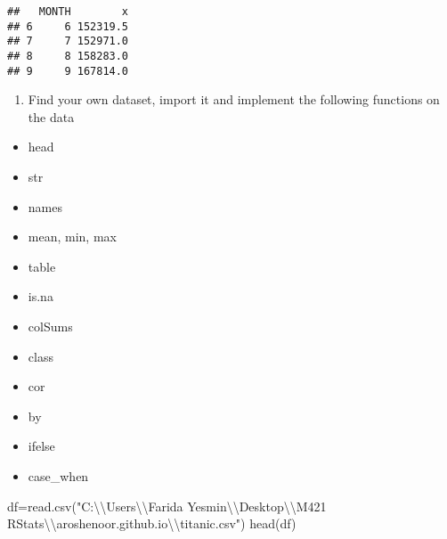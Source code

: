 \documentclass[
]{article}
\newenvironment{Shaded}{\begin{snugshade}}{\end{snugshade}}
\newcommand{\FunctionTok}[1]{\textcolor[rgb]{0.00,0.00,0.00}{#1}}
\newcommand{\NormalTok}[1]{#1}
\newcommand{\OtherTok}[1]{\textcolor[rgb]{0.56,0.35,0.01}{#1}}
\newcommand{\SpecialCharTok}[1]{\textcolor[rgb]{0.00,0.00,0.00}{#1}}
\newcommand{\StringTok}[1]{\textcolor[rgb]{0.31,0.60,0.02}{#1}}
\providecommand{\tightlist}{%
  \setlength{\itemsep}{0pt}\setlength{\parskip}{0pt}}
\begin{document}
\begin{verbatim}
##   MONTH        x
## 6     6 152319.5
## 7     7 152971.0
## 8     8 158283.0
## 9     9 167814.0
\end{verbatim}

\begin{enumerate}
\def\labelenumi{\arabic{enumi}.}
\setcounter{enumi}{15}
\tightlist
\item
  Find your own dataset, import it and implement the following functions
  on the data
\end{enumerate}

\begin{itemize}
\tightlist
\item
  head
\item
  str
\item
  names
\item
  mean, min, max
\item
  table
\item
  is.na
\item
  colSums
\item
  class
\item
  cor
\item
  by
\item
  ifelse
\item
  case\_when
\end{itemize}

\begin{Shaded}
\begin{Highlighting}[]
\NormalTok{df}\OtherTok{=}\FunctionTok{read.csv}\NormalTok{(}\StringTok{"C:}\SpecialCharTok{\textbackslash{}\textbackslash{}}\StringTok{Users}\SpecialCharTok{\textbackslash{}\textbackslash{}}\StringTok{Farida Yesmin}\SpecialCharTok{\textbackslash{}\textbackslash{}}\StringTok{Desktop}\SpecialCharTok{\textbackslash{}\textbackslash{}}\StringTok{M421 RStats}\SpecialCharTok{\textbackslash{}\textbackslash{}}\StringTok{aroshenoor.github.io}\SpecialCharTok{\textbackslash{}\textbackslash{}}\StringTok{titanic.csv"}\NormalTok{)}
\FunctionTok{head}\NormalTok{(df)}
\end{Highlighting}
\end{Shaded}
\end{document}
